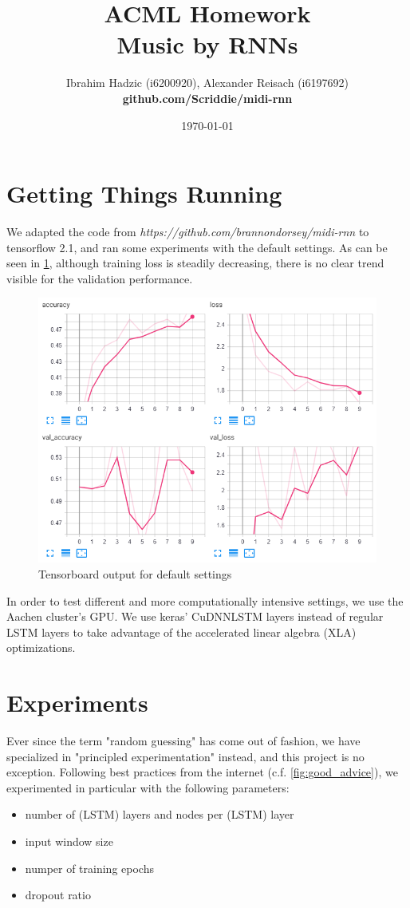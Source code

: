 \documentclass{article}
\title{ACML Homework \\ Music by RNNs}
\author{Ibrahim Hadzic (i6200920), Alexander Reisach (i6197692) \\ \textbf{github.com/Scriddie/midi-rnn}}
\date{\today}
\begin{document}
\maketitle

\section{Getting Things Running}
We adapted the code from \textit{https://github.com/brannondorsey/midi-rnn} to tensorflow 2.1, and ran some experiments with the default settings. As can be seen in \ref{fig:tensorboard_2}, although training loss is steadily decreasing, there is no clear trend visible for the validation performance.

\begin{figure}[H]
    \centering
    \includegraphics[scale=0.40]{tensorboard_2.png}
    \caption{Tensorboard output for default settings}
    \label{fig:tensorboard_2}
\end{figure}

In order to test different and more computationally intensive settings, we use the Aachen cluster's GPU. We use keras' CuDNNLSTM layers instead of regular LSTM layers to take advantage of the accelerated linear algebra (XLA) optimizations.


\section{Experiments}
Ever since the term "random guessing" has come out of fashion, we have specialized in "principled experimentation" instead, and this project is no exception. Following best practices from the internet (c.f. \ref{fig:good_advice}), we experimented in particular with the following parameters:
\begin{itemize}
    \item number of (LSTM) layers and nodes per (LSTM) layer
    \item input window size
    \item numper of training epochs
    \item dropout ratio
\end{itemize}
\end{document}
